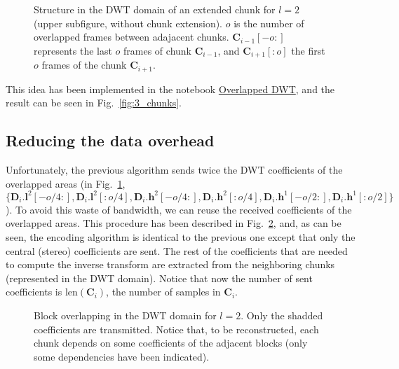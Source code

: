 
\begin{figure}
  \centering
  \caption{Structure in the DWT domain of an extended chunk for $l=2$
    (upper subfigure, without chunk extension). $o$ is the number of
    overlapped frames between adajacent chunks.
    ${\mathbf C}_{i-1}[-o:]$ represents the last $o$ frames of chunk
    ${\mathbf C}_{i-1}$, and ${\mathbf C}_{i+1}[:o]$ the first $o$
    frames of the chunk ${\mathbf C}_{i+1}$.}
  \label{fig:subbands}
\end{figure}

This idea has been implemented in the notebook
\href{https://github.com/Tecnologias-multimedia/Tecnologias-multimedia.github.io/blob/master/contents/transform_coding/overlapped_DWT_I.ipynb}{Overlapped
  DWT}, and the result can be seen in Fig.~\ref{fig:3_chunks}.


\subsection{Reducing the data overhead}

\label{sec:reducing}

Unfortunately, the previous algorithm sends twice the DWT coefficients
of the overlapped areas (in Fig.~\ref{fig:subbands}, $\{{\mathbf
  D}_i.{\mathbf l}^2[-o/4:], {\mathbf D}_i.{\mathbf l}^2[:o/4],
{\mathbf D}_i.{\mathbf h}^2[-o/4:], {\mathbf D}_i.{\mathbf
  h}^2[:o/4], {\mathbf D}_i.{\mathbf h}^1[-o/2:], {\mathbf
  D}_i.{\mathbf h}^1[:o/2]\}$). To avoid this waste of bandwidth, we
can reuse the received coefficients of the overlapped areas. This
procedure has been described in Fig.~\ref{fig:overlapping}, and,
as can be seen, the encoding algorithm is identical to the previous
one except that only the central (stereo) coefficients are
sent. The rest of the coefficients that are needed to compute the inverse
transform are extracted from the neighboring chunks (represented in the
DWT domain). Notice that now the number of sent coefficients is
$\text{len}({\mathbf C}_i)$, the number of samples in ${\mathbf C}_i$.

\begin{figure}
  \centering
  \caption{Block overlapping in the DWT domain for $l=2$. Only the
    shadded coefficients are transmitted. Notice that, to be
    reconstructed, each chunk depends on some coefficients of the
    adjacent blocks (only some dependencies have been indicated).}
  \label{fig:overlapping}
\end{figure}


